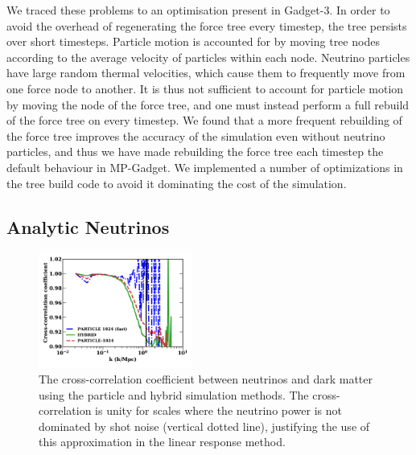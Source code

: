 \documentclass[useAMS, usenatbib]{mnras}
\begin{document}
We traced these problems to an optimisation present in Gadget-3. In order to avoid the overhead of regenerating the force tree every timestep, the tree persists over short timesteps. Particle motion is accounted for by moving tree nodes according to the average velocity of particles within each node. Neutrino particles have large random thermal velocities, which cause them to frequently move from one force node to another. It is thus not sufficient to account for particle motion by moving the node of the force tree, and one must instead perform a full rebuild of the force tree on every timestep. We found that a more frequent rebuilding of the force tree improves the accuracy of the simulation even without neutrino particles, and thus we have made rebuilding the force tree each timestep the default behaviour in MP-Gadget. We implemented a number of optimizations in the tree build code to avoid it dominating the cost of the simulation.

\subsection{Analytic Neutrinos}
\label{sec:analytic}

\begin{figure}
\includegraphics[width=0.45\textwidth]{nuplots/corr_coeff-1.pdf}
  \caption{The cross-correlation coefficient between neutrinos and dark matter using the particle and hybrid simulation methods.
  The cross-correlation is unity for scales where the neutrino power is not dominated by shot noise (vertical dotted line), justifying the use of
  this approximation in the linear response method.
  }
  \label{fig:cross-corr}
\end{figure}
\end{document}
